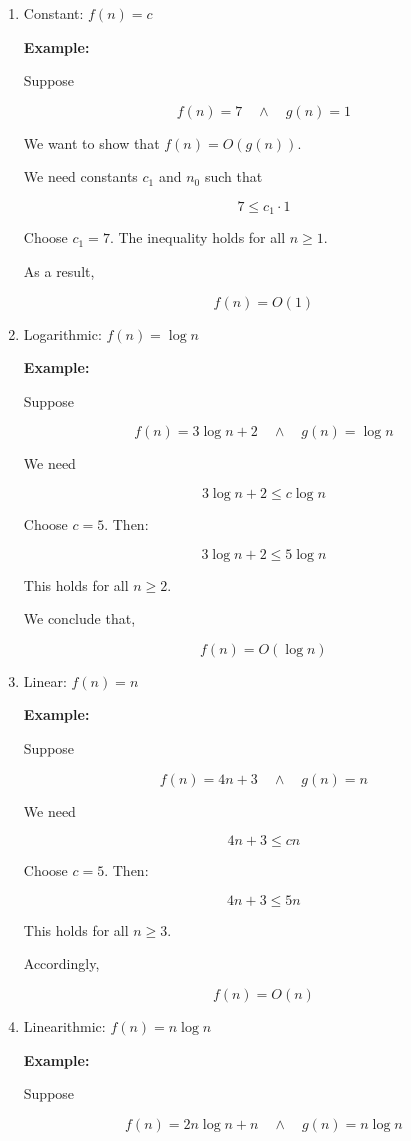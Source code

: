 \documentclass[12pt,a4paper,openany]{article}
\begin{document}
\begin{enumerate}


\item Constant: $f(n) = c$

\textbf{Example:}

Suppose

\[
f(n) = 7 \quad \land \quad g(n) = 1
\]

We want to show that $f(n) = O(g(n))$.

We need constants $c_1$ and $n_0$ such that

\[
7 \le c_1 \cdot 1
\]

Choose $c_1 = 7$. The inequality holds for all $n \ge 1$.

As a result,

\[
\boxed{f(n) = O(1)}
\]


\item Logarithmic: $f(n) = \log n$

\textbf{Example:}

Suppose

\[
f(n) = 3\log n + 2 \quad \land \quad g(n) = \log n
\]

We need

\[
3\log n + 2 \le c \log n
\]

Choose $c = 5$. Then:

\[
3\log n + 2 \le 5\log n
\]

This holds for all $n \ge 2$.

We conclude that,

\[
\boxed{f(n) = O(\log n)}
\]


\item Linear: $f(n) = n$

\textbf{Example:}

Suppose

\[
f(n) = 4n + 3 \quad \land \quad g(n) = n
\]

We need

\[
4n + 3 \le c n
\]

Choose $c = 5$. Then:

\[
4n + 3 \le 5n
\]

This holds for all $n \ge 3$.

Accordingly,

\[
\boxed{f(n) = O(n)}
\]


\item Linearithmic: $f(n) = n\log n$

\textbf{Example:}

Suppose

\[
f(n) = 2n\log n + n \quad \land \quad g(n) = n\log n
\]


\end{enumerate}
\end{document}
